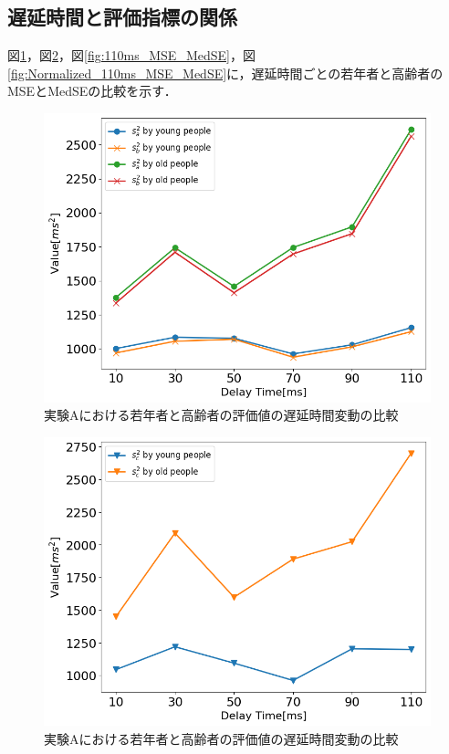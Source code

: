 \subsection{遅延時間と評価指標の関係}
図\ref{fig:Var_110ms_Sa_Sb}，図\ref{fig:Var_110ms_Sc}，図\ref{fig:110ms_MSE_MedSE}，図\ref{fig:Normalized_110ms_MSE_MedSE}に，遅延時間ごとの若年者と高齢者のMSEとMedSEの比較を示す．
\begin{figure}[tbp]
  \centering
  \includegraphics[scale=0.5]{figures/Honbann/Comparison_young_old/Var_110ms_Sa_Sb.png}
  \caption{実験Aにおける若年者と高齢者の評価値の遅延時間変動の比較}
  \label{fig:Var_110ms_Sa_Sb}
\end{figure}
\begin{figure}[tbp]
  \centering
  \includegraphics[scale=0.5]{figures/Honbann/Comparison_young_old/Var_110ms_Sc.png}
  \caption{実験Aにおける若年者と高齢者の評価値の遅延時間変動の比較}
  \label{fig:Var_110ms_Sc}
\end{figure}

